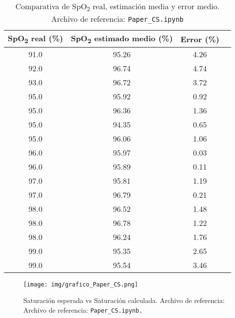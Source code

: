 \begin{table}[H]
\centering
\begin{tabular}{|c|c|c|c|}
\hline
\textbf{SpO\textsubscript{2} real (\%)} & \textbf{SpO\textsubscript{2} estimado medio (\%)} & \textbf{Error (\%)} \\
\hline
91.0 & 95.26 & 4.26 \\
\hline
 92.0 & 96.74 & 4.74 \\
 \hline
93.0 & 96.72 & 3.72 \\
\hline
95.0 & 95.92 & 0.92 \\
\hline
95.0 & 96.36 & 1.36 \\
\hline
95.0 & 94.35 & 0.65 \\
\hline
 95.0 & 96.06 & 1.06 \\
 \hline
 96.0 & 95.97 & 0.03 \\
 \hline
96.0 & 95.89 & 0.11 \\
\hline
97.0 & 95.81 & 1.19 \\
\hline
97.0 & 96.79 & 0.21 \\
\hline
98.0 & 96.52 & 1.48 \\
\hline
98.0 & 96.78 & 1.22 \\
\hline
98.0 & 96.24 & 1.76 \\
\hline
99.0 & 95.35 & 2.65 \\
\hline
99.0 & 95.54 & 3.46 \\
\hline
\end{tabular}
\caption{Comparativa de SpO\textsubscript{2} real, estimación media y error medio. Archivo de referencia: \texttt{Paper\_CS.ipynb}}
\label{tabla:spo2_error_medio}
\end{table}

\begin{figure}[H]
    \centering
    \texttt{[image: img/grafico\_Paper\_CS.png]}
    \caption{Saturación esperada vs Saturación calculada. Archivo de referencia: Archivo de referencia: \texttt{Paper\_CS.ipynb.}}
    \label{fig:grafico_Paper_CS}
\end{figure}


